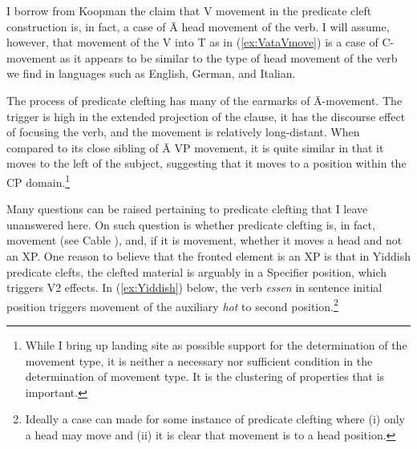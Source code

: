 \documentclass[output=paper,colorlinks,citecolor=brown,
]{langscibook}
\begin{document}
\z

\ea \label{ex:VataVmove}
    \z
\z

I borrow from Koopman the claim that V movement in the predicate cleft construction is, in fact, a case of \=A head movement of the verb.  I will assume, however, that movement of the V into T as in (\ref{ex:VataVmove}) is a case of C-movement as it appears to be similar to the type of head movement of the verb we find in languages such as English, German, and Italian.  

The process of predicate clefting has many of the earmarks of \=A-movement.  The trigger is high in the extended projection of the clause, it has the discourse effect of focusing the verb, and the movement is relatively long-distant.  When compared to its close sibling of \=A VP movement, it is quite similar in that it moves to the left of the subject, suggesting that it moves to a position within the CP domain.\footnote{While I bring up landing site as possible support for the determination of the movement type, it is neither a necessary nor sufficient condition in the determination of movement type.  It is the clustering of properties that is important.}

Many questions can be raised pertaining to predicate clefting that I leave unanswered here.  On such question is whether predicate clefting is, in fact, movement (see Cable \citeyear{Cable:2004}), and, if it is movement, whether it moves a head and not an XP.  One reason to believe that the fronted element is an XP is that in Yiddish predicate clefts, the clefted material is arguably in a Specifier position, which triggers V2 effects.  In (\ref{ex:Yiddish}) below, the verb \textit{essen} in sentence initial position triggers movement of the auxiliary \textit{hot} to second position.\footnote{Ideally a case can made for some instance of predicate clefting where (i) only a head may move and (ii) it is clear that movement is to a head position.}
\end{document}
